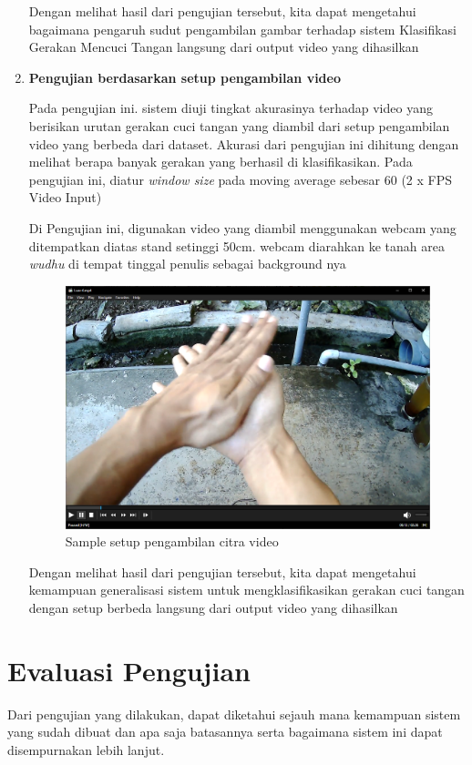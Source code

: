 \begin{enumerate}
	Dengan melihat hasil dari pengujian tersebut, kita dapat mengetahui bagaimana pengaruh sudut pengambilan gambar terhadap sistem Klasifikasi Gerakan Mencuci Tangan langsung dari output video yang dihasilkan
	
	\item \textbf{Pengujian berdasarkan setup pengambilan video}
	
	Pada pengujian ini. sistem diuji tingkat akurasinya terhadap video yang berisikan urutan gerakan cuci tangan yang diambil dari setup pengambilan video yang berbeda dari dataset. Akurasi dari pengujian ini dihitung dengan melihat berapa banyak gerakan yang berhasil di klasifikasikan. Pada pengujian ini, diatur \textit{window size} pada moving average sebesar 60 (2 x FPS Video Input)
	
	Di Pengujian ini, digunakan video yang diambil menggunakan webcam yang ditempatkan diatas stand setinggi 50cm. webcam diarahkan ke tanah area \textit{wudhu} di tempat tinggal penulis sebagai background nya
	
	\begin{figure}[!ht]
		\centering
		\includegraphics[width=0.6\columnwidth]{gambar/setupwudhu.png}
		\caption{Sample setup pengambilan citra video}
		\label{setupwudhu}
	\end{figure}
	
	Dengan melihat hasil dari pengujian tersebut, kita dapat mengetahui kemampuan generalisasi sistem untuk mengklasifikasikan gerakan cuci tangan dengan setup berbeda langsung dari output video yang dihasilkan
\end{enumerate}

\newpage
\section{Evaluasi Pengujian}
\label{sec:analisispengujian}

Dari pengujian yang dilakukan, dapat diketahui sejauh mana kemampuan sistem yang sudah dibuat dan apa saja batasannya serta bagaimana sistem ini dapat disempurnakan lebih lanjut.

